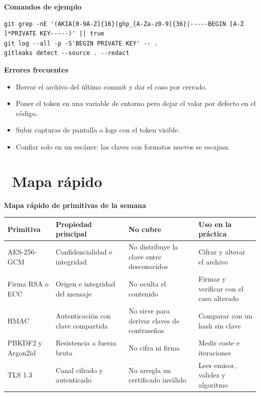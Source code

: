 \documentclass[11pt,a4paper]{article}
\newcommand{\iconotexto}[2]{\textcolor{cyanNeon}{\faIcon{#1}}~#2}
\begin{document}
\textbf{Comandos de ejemplo}

\begin{lstlisting}[style=estiloCodigo]
git grep -nE '(AKIA[0-9A-Z]{16}|ghp_[A-Za-z0-9]{36}|-----BEGIN [A-Z ]*PRIVATE KEY-----)' || true
git log --all -p -S'BEGIN PRIVATE KEY' -- .
gitleaks detect --source . --redact
\end{lstlisting}

\textbf{Errores frecuentes}

\begin{itemize}[leftmargin=1.4em,itemsep=2pt,topsep=3pt]
  \item Borrar el archivo del último commit y dar el caso por cerrado.
  \item Poner el token en una variable de entorno pero dejar el valor por defecto en el código.
  \item Subir capturas de pantalla o logs con el token visible.
  \item Confiar solo en un escáner: las claves con formatos nuevos se escapan.
\end{itemize}


\section{\iconotexto{table}{Mapa rápido}}

\begin{center}
\begin{minipage}{\linewidth}
\centering
{\footnotesize
\textbf{Mapa rápido de primitivas de la semana}\par\smallskip
\begin{tabular}{@{}>{\raggedright\arraybackslash}p{2.40cm}>{\raggedright\arraybackslash}p{3.00cm}>{\raggedright\arraybackslash}p{4.80cm}>{\raggedright\arraybackslash}p{4.40cm}@{}}
\toprule
\textbf{Primitiva} & \textbf{Propiedad principal} & \textbf{No cubre} & \textbf{Uso en la práctica} \\
\midrule
AES-256-GCM & Confidencialidad e integridad & No distribuye la clave entre desconocidos & Cifrar y alterar el archivo \\
Firma RSA o ECC & Origen e integridad del mensaje & No oculta el contenido & Firmar y verificar con el caso alterado \\
HMAC & Autenticación con clave compartida & No sirve para derivar claves de contraseñas & Comparar con un hash sin clave \\
PBKDF2 y Argon2id & Resistencia a fuerza bruta & No cifra ni firma & Medir coste e iteraciones \\
TLS 1.3 & Canal cifrado y autenticado & No arregla un certificado inválido & Leer emisor, validez y algoritmo \\
\bottomrule
\end{tabular}
}
\end{minipage}
\end{center}
\end{document}
